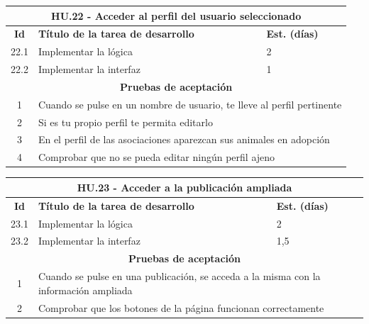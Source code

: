 \begin{table}[H]
	\centering
\begin{tabular}{|c|p{9.5cm}|p{1cm}|}
	\hline
	\multicolumn{3}{|c|}{\textbf{HU.22 - Acceder al perfil del usuario seleccionado}} \\
	\hline
	\textbf{Id} & \textbf{Título de la tarea de desarrollo} & \textbf{Est. (días)} \\
	\hline
	22.1 &  Implementar la lógica & 2 \\ \hline
	22.2 &  Implementar la interfaz & 1 \\ \hline
	\multicolumn{3}{|c|}{\textbf{Pruebas de aceptación}} \\ \hline
	1 & \multicolumn{2}{|p{12cm}|}{Cuando se pulse en un nombre de usuario, te lleve al perfil pertinente} \\ \hline
	2 & \multicolumn{2}{|p{12cm}|}{Si es tu propio perfil te permita editarlo} \\ \hline
	3 & \multicolumn{2}{|p{12cm}|}{En el perfil de las asociaciones aparezcan sus animales en adopción} \\ \hline
	4 & \multicolumn{2}{|p{12cm}|}{Comprobar que no se pueda editar ningún perfil ajeno} \\ \hline
	
\end{tabular} 
\end{table}

\begin{table}[H]
	\centering
\begin{tabular}{|c|p{9.5cm}|p{1cm}|}
	\hline
	\multicolumn{3}{|c|}{\textbf{HU.23 - Acceder a la publicación ampliada}} \\
	\hline
	\textbf{Id} & \textbf{Título de la tarea de desarrollo} & \textbf{Est. (días)} \\
	\hline
	23.1 &  Implementar la lógica & 2 \\ \hline
	23.2 &  Implementar la interfaz & 1,5 \\ \hline
	\multicolumn{3}{|c|}{\textbf{Pruebas de aceptación}} \\ \hline
	1 & \multicolumn{2}{|p{12cm}|}{Cuando se pulse en una publicación, se acceda a la misma con la información ampliada} \\ \hline
	2 & \multicolumn{2}{|p{12cm}|}{Comprobar que los botones de la página funcionan correctamente} \\ \hline
	
\end{tabular}
\end{table}

